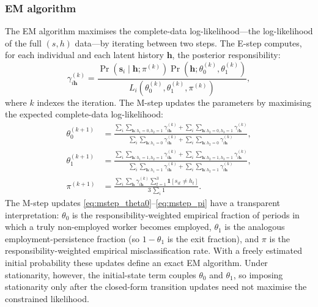 \subsubsection*{EM algorithm}

The EM algorithm maximises the complete-data log-likelihood---the
log-likelihood of the full $(s, h)$ data---by iterating between two steps.
The E-step computes, for each individual and each latent history
$\mathbf{h}$, the posterior responsibility:
\begin{equation}
  \gamma_{i\mathbf{h}}^{(k)} =
  \frac{\Pr(\mathbf{s}_i \mid \mathbf{h}; \pi^{(k)}) \Pr(\mathbf{h}; \theta_0^{(k)}, \theta_1^{(k)})}
       {L_i(\theta_0^{(k)}, \theta_1^{(k)}, \pi^{(k)})},
  \label{eq:estep}
\end{equation}
where $k$ indexes the iteration. The M-step updates the parameters by
maximising the expected complete-data log-likelihood:
\begin{align}
  \theta_0^{(k+1)} &= \frac{\sum_i \sum_{\mathbf{h}: h_1=0, h_2=1} \gamma_{i\mathbf{h}}^{(k)}
                            + \sum_i \sum_{\mathbf{h}: h_2=0, h_3=1} \gamma_{i\mathbf{h}}^{(k)}}
                           {\sum_i \sum_{\mathbf{h}: h_1=0} \gamma_{i\mathbf{h}}^{(k)}
                            + \sum_i \sum_{\mathbf{h}: h_2=0} \gamma_{i\mathbf{h}}^{(k)}}, \label{eq:mstep_theta0}\\
  \theta_1^{(k+1)} &= \frac{\sum_i \sum_{\mathbf{h}: h_1=1, h_2=1} \gamma_{i\mathbf{h}}^{(k)}
                            + \sum_i \sum_{\mathbf{h}: h_2=1, h_3=1} \gamma_{i\mathbf{h}}^{(k)}}
                           {\sum_i \sum_{\mathbf{h}: h_1=1} \gamma_{i\mathbf{h}}^{(k)}
                            + \sum_i \sum_{\mathbf{h}: h_2=1} \gamma_{i\mathbf{h}}^{(k)}}, \label{eq:mstep_theta1}\\
  \pi^{(k+1)}     &= \frac{\sum_i \sum_{\mathbf{h}} \gamma_{i\mathbf{h}}^{(k)}
                           \sum_{t=1}^{3} \mathbf{1}[s_{it} \ne h_t]}
                          {3\, \sum_i 1}. \label{eq:mstep_pi}
\end{align}
The M-step updates \eqref{eq:mstep_theta0}--\eqref{eq:mstep_pi} have a
transparent interpretation: $\theta_0$ is the responsibility-weighted empirical
fraction of periods in which a truly non-employed worker becomes employed,
$\theta_1$ is the analogous employment-persistence fraction (so
$1-\theta_1$ is the exit fraction), and $\pi$ is the
responsibility-weighted empirical misclassification rate. With a freely
estimated initial probability these updates define an exact EM algorithm.
Under stationarity, however, the initial-state term couples $\theta_0$ and
$\theta_1$, so imposing stationarity only after the closed-form transition
updates need not maximise the constrained likelihood.

